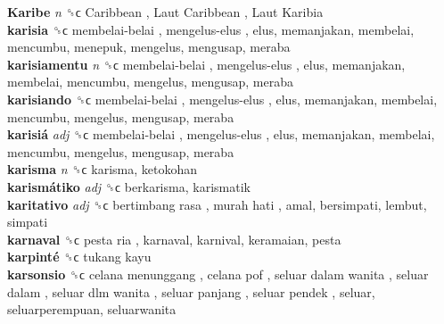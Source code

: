 \textbf{Karibe} \emph{n}  ␝ϲ   Caribbean ,  Laut Caribbean ,  Laut Karibia   \\
\textbf{karisia} ␝ϲ   membelai-belai ,  mengelus-elus , elus, memanjakan, membelai, mencumbu, menepuk, mengelus, mengusap, meraba  \\
\textbf{karisiamentu} \emph{n}  ␝ϲ   membelai-belai ,  mengelus-elus , elus, memanjakan, membelai, mencumbu, mengelus, mengusap, meraba  \\
\textbf{karisiando} ␝ϲ   membelai-belai ,  mengelus-elus , elus, memanjakan, membelai, mencumbu, mengelus, mengusap, meraba  \\
\textbf{karisiá} \emph{adj}  ␝ϲ   membelai-belai ,  mengelus-elus , elus, memanjakan, membelai, mencumbu, mengelus, mengusap, meraba  \\
\textbf{karisma} \emph{n}  ␝ϲ  karisma, ketokohan  \\
\textbf{karismátiko} \emph{adj}  ␝ϲ  berkarisma, karismatik  \\
\textbf{karitativo} \emph{adj}  ␝ϲ   bertimbang rasa ,  murah hati , amal, bersimpati, lembut, simpati  \\
\textbf{karnaval} ␝ϲ   pesta ria , karnaval, karnival, keramaian, pesta  \\
\textbf{karpinté} ␝ϲ   tukang kayu   \\
\textbf{karsonsio} ␝ϲ   celana menunggang ,  celana pof ,  seluar dalam wanita ,  seluar dalam ,  seluar dlm wanita ,  seluar panjang ,  seluar pendek , seluar, seluarperempuan, seluarwanita  \\
